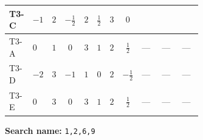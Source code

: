 \documentclass[8pt]{article}
\begin{document}
\begin{landscape}
\begin{longtable}{@{}llcccccc >{\raggedright\arraybackslash}p{0.21\linewidth} >{\raggedright\arraybackslash}p{0.21\linewidth} >{\raggedright\arraybackslash}p{0.21\linewidth}@{}}
T3-C & $-1$ & $2$ & $-\frac{1}{2}$ & $2$ & $\frac{1}{2}$ & $3$ & $0$ & \scriptsize\adjustbox{max width=\linewidth}{$\begin{gathered} \frac{i lambda12Inv2 \overline{y_{1}} \overline{y_{2}}}{6 MF}\end{gathered}$} & \scriptsize\adjustbox{max width=\linewidth}{$\begin{gathered} \frac{\sqrt{3} i g_{2}^{2} \overline{y_{1}} \overline{y_{2}}}{8 MF}\end{gathered}$} & \scriptsize\adjustbox{max width=\linewidth}{$\begin{gathered} - \frac{\sqrt{3} i ye \overline{y_{1}} \overline{y_{2}} \overline{ye}}{24 MF}\end{gathered}$} \\
\midrule
T3-A & $0$ & $1$ & $0$ & $3$ & $1$ & $2$ & $\frac{1}{2}$ & --- & --- & --- \\
\midrule
T3-D & $-2$ & $3$ & $-1$ & $1$ & $0$ & $2$ & $-\frac{1}{2}$ & --- & --- & --- \\
\midrule
T3-E & $0$ & $3$ & $0$ & $3$ & $1$ & $2$ & $\frac{1}{2}$ & --- & --- & --- \\
\midrule
\bottomrule
\end{longtable}
\clearpage
\noindent\textbf{Search name: }\texttt{1,2,6,9}\par\smallskip

\end{landscape}
\end{document}
